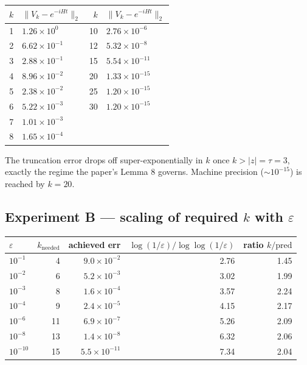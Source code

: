 \documentclass[11pt]{article}
\newcommand{\eps}{\varepsilon}
\begin{document}
\begin{center}\small
\begin{tabular}{@{}rlrl@{}}
\toprule
$k$ & $\|V_k - e^{-iHt}\|_2$ & $k$ & $\|V_k - e^{-iHt}\|_2$ \\
\midrule
 1 & $1.26\times 10^{0}$   & 10 & $2.76\times 10^{-6}$ \\
 2 & $6.62\times 10^{-1}$  & 12 & $5.32\times 10^{-8}$ \\
 3 & $2.88\times 10^{-1}$  & 15 & $5.54\times 10^{-11}$ \\
 4 & $8.96\times 10^{-2}$  & 20 & $1.33\times 10^{-15}$ \\
 5 & $2.38\times 10^{-2}$  & 25 & $1.20\times 10^{-15}$ \\
 6 & $5.22\times 10^{-3}$  & 30 & $1.20\times 10^{-15}$ \\
 7 & $1.01\times 10^{-3}$  &    & \\
 8 & $1.65\times 10^{-4}$  &    & \\
\bottomrule
\end{tabular}
\end{center}

The truncation error drops off super-exponentially in $k$ once
$k > |z| = \tau = 3$, exactly the regime the paper's Lemma 8 governs.
Machine precision ($\sim 10^{-15}$) is reached by $k=20$.

\subsection{Experiment B --- scaling of required $k$ with $\eps$}
\begin{center}\small
\begin{tabular}{@{}lrrrr@{}}
\toprule
$\eps$ & $k_{\text{needed}}$ & achieved err & $\log(1/\eps)/\log\log(1/\eps)$ & ratio $k/\text{pred}$ \\
\midrule
$10^{-1}$  &  4 & $9.0\!\times\!10^{-2}$  & 2.76 & 1.45 \\
$10^{-2}$  &  6 & $5.2\!\times\!10^{-3}$  & 3.02 & 1.99 \\
$10^{-3}$  &  8 & $1.6\!\times\!10^{-4}$  & 3.57 & 2.24 \\
$10^{-4}$  &  9 & $2.4\!\times\!10^{-5}$  & 4.15 & 2.17 \\
$10^{-6}$  & 11 & $6.9\!\times\!10^{-7}$  & 5.26 & 2.09 \\
$10^{-8}$  & 13 & $1.4\!\times\!10^{-8}$  & 6.32 & 2.06 \\
$10^{-10}$ & 15 & $5.5\!\times\!10^{-11}$ & 7.34 & 2.04 \\
\bottomrule
\end{tabular}
\end{center}
\end{document}
